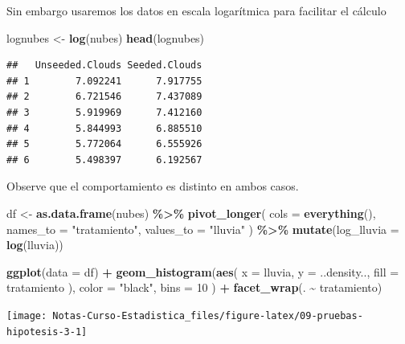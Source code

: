 \documentclass[
  12pt,
]{book}
\newenvironment{Shaded}{\begin{snugshade}}{\end{snugshade}}
\newcommand{\DataTypeTok}[1]{\textcolor[rgb]{0.13,0.29,0.53}{#1}}
\newcommand{\DecValTok}[1]{\textcolor[rgb]{0.00,0.00,0.81}{#1}}
\newcommand{\KeywordTok}[1]{\textcolor[rgb]{0.13,0.29,0.53}{\textbf{#1}}}
\newcommand{\NormalTok}[1]{#1}
\newcommand{\OperatorTok}[1]{\textcolor[rgb]{0.81,0.36,0.00}{\textbf{#1}}}
\newcommand{\StringTok}[1]{\textcolor[rgb]{0.31,0.60,0.02}{#1}}
\begin{document}
Sin embargo usaremos los datos en escala logarítmica para facilitar el cálculo

\begin{Shaded}
\begin{Highlighting}[]
\NormalTok{lognubes \textless{}{-}}\StringTok{ }\KeywordTok{log}\NormalTok{(nubes)}
\KeywordTok{head}\NormalTok{(lognubes)}
\end{Highlighting}
\end{Shaded}

\begin{verbatim}
##   Unseeded.Clouds Seeded.Clouds
## 1        7.092241      7.917755
## 2        6.721546      7.437089
## 3        5.919969      7.412160
## 4        5.844993      6.885510
## 5        5.772064      6.555926
## 6        5.498397      6.192567
\end{verbatim}

Observe que el comportamiento es distinto en ambos casos.

\begin{Shaded}
\begin{Highlighting}[]
\NormalTok{df \textless{}{-}}\StringTok{ }\KeywordTok{as.data.frame}\NormalTok{(nubes) }\OperatorTok{\%\textgreater{}\%}
\StringTok{  }\KeywordTok{pivot\_longer}\NormalTok{(}
    \DataTypeTok{cols =} \KeywordTok{everything}\NormalTok{(),}
    \DataTypeTok{names\_to =} \StringTok{"tratamiento"}\NormalTok{, }\DataTypeTok{values\_to =} \StringTok{"lluvia"}
\NormalTok{  ) }\OperatorTok{\%\textgreater{}\%}
\StringTok{  }\KeywordTok{mutate}\NormalTok{(}\DataTypeTok{log\_lluvia =} \KeywordTok{log}\NormalTok{(lluvia))}

\KeywordTok{ggplot}\NormalTok{(}\DataTypeTok{data =}\NormalTok{ df) }\OperatorTok{+}
\StringTok{  }\KeywordTok{geom\_histogram}\NormalTok{(}\KeywordTok{aes}\NormalTok{(}
    \DataTypeTok{x =}\NormalTok{ lluvia,}
    \DataTypeTok{y =}\NormalTok{ ..density..,}
    \DataTypeTok{fill =}\NormalTok{ tratamiento}
\NormalTok{  ),}
  \DataTypeTok{color =} \StringTok{"black"}\NormalTok{, }\DataTypeTok{bins =} \DecValTok{10}
\NormalTok{  ) }\OperatorTok{+}
\StringTok{  }\KeywordTok{facet\_wrap}\NormalTok{(. }\OperatorTok{\textasciitilde{}}\StringTok{ }\NormalTok{tratamiento)}
\end{Highlighting}
\end{Shaded}

\begin{center}\texttt{[image: Notas-Curso-Estadistica\_files/figure-latex/09-pruebas-hipotesis-3-1]} \end{center}
\end{document}
